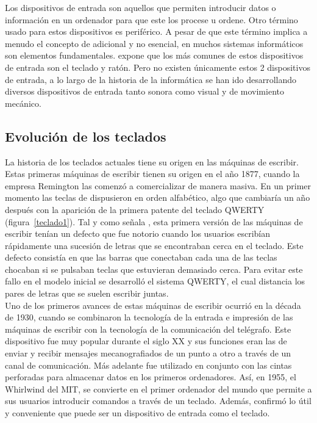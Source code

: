 Los dispositivos de entrada son aquellos que permiten introducir datos o informaci\'on en un ordenador para que este los procese u ordene. Otro t\'ermino usado para estos dispositivos es perif\'erico. A pesar de que este t\'ermino implica a menudo el concepto de adicional y no esencial, en muchos sistemas inform\'aticos son elementos fundamentales. \cite{entradasalida} expone que los m\'as comunes de estos dispositivos de entrada son el teclado y rat\'on. Pero no existen \'unicamente estos 2 dispositivos de entrada, a lo largo de la historia de la inform\'atica se han ido desarrollando diversos dispositivos de entrada tanto sonora como visual y de movimiento mec\'anico.\\



\subsection{Evoluci\'on de los teclados}

La historia de los teclados actuales tiene su origen en las m\'aquinas de escribir. Estas primeras m\'aquinas de escribir tienen su origen en el a\~no 1877, cuando la empresa Remington las comenz\'o a comercializar de manera masiva. En un primer momento las teclas de dispusieron en orden alfab\'etico, algo que cambiar\'ia un a\~no despu\'es con la aparici\'on de la primera patente del teclado QWERTY (figura~\ref{teclado1}). Tal y como se\~nala \cite{jimmy}, esta primera versi\'on de las m\'aquinas de escribir ten\'ian un defecto que fue notorio cuando los usuarios escrib\'ian r\'apidamente una sucesi\'on de letras que se encontraban cerca en el teclado. Este defecto consist\'ia en que las barras que conectaban cada una de las teclas chocaban si se pulsaban teclas que estuvieran demasiado cerca.  Para evitar este fallo en el modelo inicial se desarroll\'o el sistema QWERTY, el cual distancia los pares de letras que se suelen escribir juntas.\\

Uno de los primeros avances de estas m\'aquinas de escribir ocurri\'o en la d\'ecada de 1930, cuando se combinaron la tecnolog\'ia de la entrada e impresi\'on de las m\'aquinas de escribir con la tecnolog\'ia de la comunicaci\'on del tel\'egrafo. Este dispositivo fue muy popular durante el siglo XX y sus funciones eran las de enviar y recibir mensajes mecanografiados de un punto a otro a trav\'es de un canal de comunicaci\'on. M\'as adelante fue utilizado en conjunto con las cintas perforadas para almacenar datos en los primeros ordenadores. As\'i, en 1955, el Whirlwind del MIT, se convierte en el primer ordenador del mundo que permite a sus usuarios introducir comandos a trav\'es de un teclado. Adem\'as, confirm\'o lo \'util y conveniente que puede ser un dispositivo de entrada como el teclado.\\

